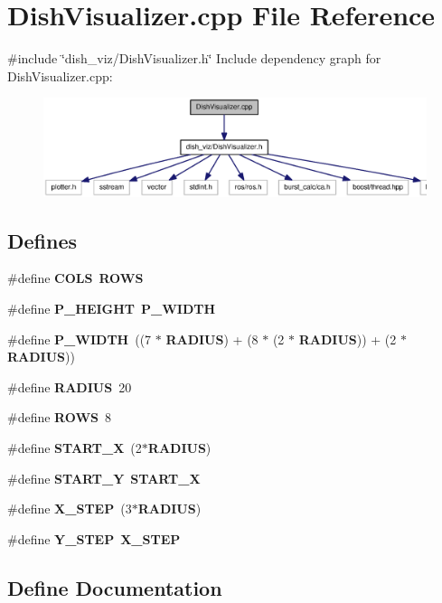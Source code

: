 \section{\-Dish\-Visualizer.\-cpp \-File \-Reference}
\label{DishVisualizer_8cpp}
{\ttfamily \#include \char`\"{}dish\-\_\-viz/\-Dish\-Visualizer.\-h\char`\"{}}\*
\-Include dependency graph for \-Dish\-Visualizer.\-cpp\-:\nopagebreak
\begin{figure}[H]
\begin{center}
\leavevmode
\includegraphics[width=350pt]{DishVisualizer_8cpp__incl}
\end{center}
\end{figure}
\subsection*{\-Defines}
\begin{DoxyCompactItemize}
\item 
\#define {\bf \-C\-O\-L\-S}~{\bf \-R\-O\-W\-S}
\item 
\#define {\bf \-P\-\_\-\-H\-E\-I\-G\-H\-T}~{\bf \-P\-\_\-\-W\-I\-D\-T\-H}
\item 
\#define {\bf \-P\-\_\-\-W\-I\-D\-T\-H}~((7 $\ast$ {\bf \-R\-A\-D\-I\-U\-S}) + (8 $\ast$ (2 $\ast$ {\bf \-R\-A\-D\-I\-U\-S})) + (2 $\ast$ {\bf \-R\-A\-D\-I\-U\-S}))
\item 
\#define {\bf \-R\-A\-D\-I\-U\-S}~20
\item 
\#define {\bf \-R\-O\-W\-S}~8
\item 
\#define {\bf \-S\-T\-A\-R\-T\-\_\-\-X}~(2$\ast${\bf \-R\-A\-D\-I\-U\-S})
\item 
\#define {\bf \-S\-T\-A\-R\-T\-\_\-\-Y}~{\bf \-S\-T\-A\-R\-T\-\_\-\-X}
\item 
\#define {\bf \-X\-\_\-\-S\-T\-E\-P}~(3$\ast${\bf \-R\-A\-D\-I\-U\-S})
\item 
\#define {\bf \-Y\-\_\-\-S\-T\-E\-P}~{\bf \-X\-\_\-\-S\-T\-E\-P}
\end{DoxyCompactItemize}


\subsection{\-Define \-Documentation}

